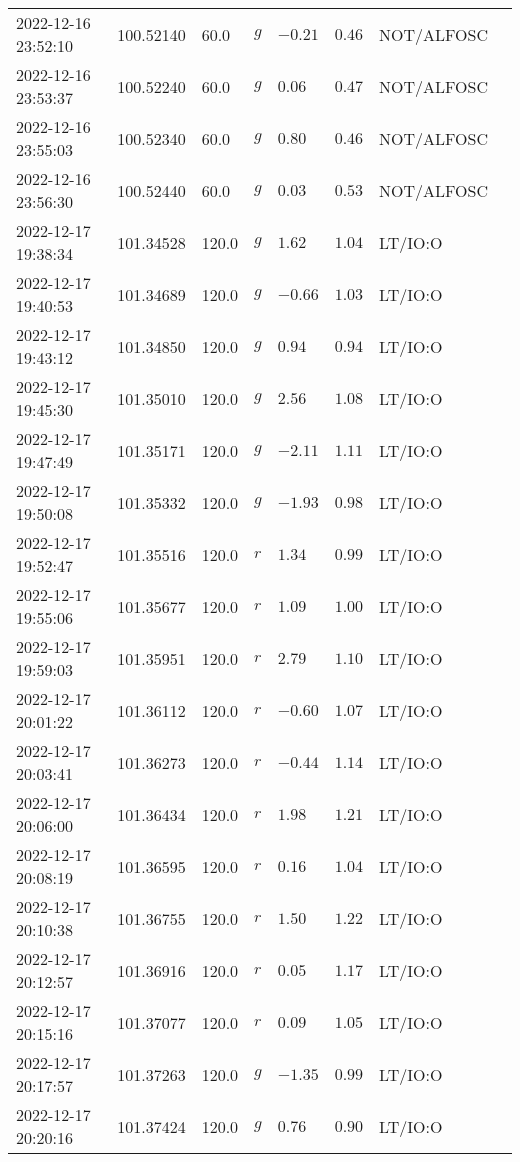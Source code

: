 \documentclass{nature_plusfigure}
\begin{document}
\begin{supplement}
\begin{center}
\begin{longtable}{llllllll}
2022-12-16 23:52:10 & 100.52140 & 60.0 & $g$ & $-0.21$ & $0.46$ & NOT/ALFOSC &  \\ 
2022-12-16 23:53:37 & 100.52240 & 60.0 & $g$ & $0.06$ & $0.47$ & NOT/ALFOSC &  \\ 
2022-12-16 23:55:03 & 100.52340 & 60.0 & $g$ & $0.80$ & $0.46$ & NOT/ALFOSC &  \\ 
2022-12-16 23:56:30 & 100.52440 & 60.0 & $g$ & $0.03$ & $0.53$ & NOT/ALFOSC &  \\ 
2022-12-17 19:38:34 & 101.34528 & 120.0 & $g$ & $1.62$ & $1.04$ & LT/IO:O &  \\ 
2022-12-17 19:40:53 & 101.34689 & 120.0 & $g$ & $-0.66$ & $1.03$ & LT/IO:O &  \\ 
2022-12-17 19:43:12 & 101.34850 & 120.0 & $g$ & $0.94$ & $0.94$ & LT/IO:O &  \\ 
2022-12-17 19:45:30 & 101.35010 & 120.0 & $g$ & $2.56$ & $1.08$ & LT/IO:O &  \\ 
2022-12-17 19:47:49 & 101.35171 & 120.0 & $g$ & $-2.11$ & $1.11$ & LT/IO:O &  \\ 
2022-12-17 19:50:08 & 101.35332 & 120.0 & $g$ & $-1.93$ & $0.98$ & LT/IO:O &  \\ 
2022-12-17 19:52:47 & 101.35516 & 120.0 & $r$ & $1.34$ & $0.99$ & LT/IO:O &  \\ 
2022-12-17 19:55:06 & 101.35677 & 120.0 & $r$ & $1.09$ & $1.00$ & LT/IO:O &  \\ 
2022-12-17 19:59:03 & 101.35951 & 120.0 & $r$ & $2.79$ & $1.10$ & LT/IO:O &  \\ 
2022-12-17 20:01:22 & 101.36112 & 120.0 & $r$ & $-0.60$ & $1.07$ & LT/IO:O &  \\ 
2022-12-17 20:03:41 & 101.36273 & 120.0 & $r$ & $-0.44$ & $1.14$ & LT/IO:O &  \\ 
2022-12-17 20:06:00 & 101.36434 & 120.0 & $r$ & $1.98$ & $1.21$ & LT/IO:O &  \\ 
2022-12-17 20:08:19 & 101.36595 & 120.0 & $r$ & $0.16$ & $1.04$ & LT/IO:O &  \\ 
2022-12-17 20:10:38 & 101.36755 & 120.0 & $r$ & $1.50$ & $1.22$ & LT/IO:O &  \\ 
2022-12-17 20:12:57 & 101.36916 & 120.0 & $r$ & $0.05$ & $1.17$ & LT/IO:O &  \\ 
2022-12-17 20:15:16 & 101.37077 & 120.0 & $r$ & $0.09$ & $1.05$ & LT/IO:O &  \\ 
2022-12-17 20:17:57 & 101.37263 & 120.0 & $g$ & $-1.35$ & $0.99$ & LT/IO:O &  \\ 
2022-12-17 20:20:16 & 101.37424 & 120.0 & $g$ & $0.76$ & $0.90$ & LT/IO:O &  \\ 

\end{longtable}
\end{center}
\end{supplement}
\end{document}
